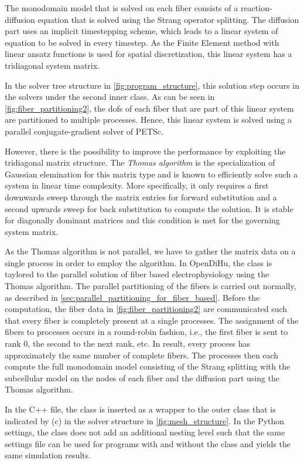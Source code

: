 The monodomain model that is solved on each fiber consists of a reaction-diffusion equation that is solved using the Strang operator splitting.
The diffusion part uses an implicit timestepping scheme, which leads to a linear system of equation to be solved in every timestep.
As the Finite Element method with linear ansatz functions is used for spatial discretization, this linear system has a tridiagonal system matrix.

In the solver tree structure in \cref{fig:program_structure}, this solution step occurs in the solvers under the second inner  class.  As can be seen in \cref{fig:fiber_partitioning2}, the dofs of each fiber that are part of this linear system are partitioned to multiple processes. Hence, this linear system is solved using a parallel conjugate-gradient solver of PETSc.

However, there is the possibility to improve the performance by exploiting the tridiagonal matrix structure. The \emph{Thomas algorithm} is the specialization of Gaussian elemination for this matrix type and is known to efficiently solve such a system in linear time complexity. More specifically, it only requires a first downwards sweep through the matrix entries for forward substitution and a second upwards sweep for back substitution to compute the solution. It is stable for diagonally dominant matrices and this condition is met for the governing system matrix.

As the Thomas algorithm is not parallel, we have to gather the matrix data on a single process in order to employ the algorithm. In OpenDiHu, the  class is taylored to the parallel solution of fiber based electrophysiology using the Thomas algorithm.
The parallel partitioning of the fibers is carried out normally, as described in \cref{sec:parallel_partitioning_for_fiber_based}. Before the computation, the fiber data in \cref{fig:fiber_partitioning2} are communicated such that every fiber is completely present at a single processes. The assignment of the fibers to processes occurs in a round-robin fashion, i.e., the first fiber is sent to rank 0, the second to the next rank, etc. In result, every process has approximately the same number of complete fibers. The processes then each compute the full monodomain model consisting of the Strang splitting with the subcellular model on the nodes of each fiber and the diffusion part using the Thomas algorithm.

In the C++ file, the  class is inserted as a wrapper to the outer  class that is indicated by (c) in the solver structure in \cref{fig:mesh_structure}. In the Python settings, the class does not add an additional nesting level such that the same settings file can be used for programs with and without the  class and yields the same simulation results.

